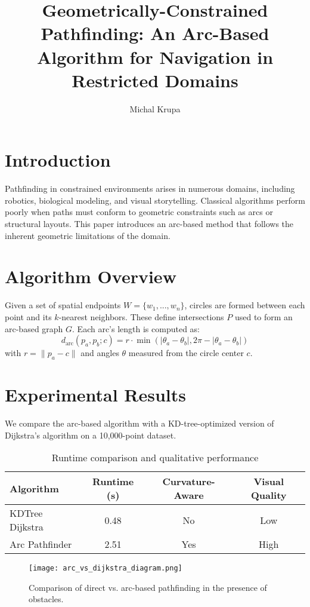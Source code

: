 \documentclass[sigconf]{acmart}
\title{Geometrically-Constrained Pathfinding: An Arc-Based Algorithm for Navigation in Restricted Domains}
\author{Michal Krupa}
\affiliation{%
  \institution{Independent Researcher}
  \country{USA}
}
\begin{document}
\maketitle

\section{Introduction}
Pathfinding in constrained environments arises in numerous domains, including robotics, biological modeling, and visual storytelling. Classical algorithms perform poorly when paths must conform to geometric constraints such as arcs or structural layouts. This paper introduces an arc-based method that follows the inherent geometric limitations of the domain.

\section{Algorithm Overview}
Given a set of spatial endpoints $W = \{w_1, ..., w_n\}$, circles are formed between each point and its $k$-nearest neighbors. These define intersections $P$ used to form an arc-based graph $G$. Each arc's length is computed as:
\[
d_{\text{arc}}(p_a, p_b; c) = r \cdot \min\left(|\theta_a - \theta_b|, 2\pi - |\theta_a - \theta_b|\right)
\]
with $r = \|p_a - c\|$ and angles $\theta$ measured from the circle center $c$.

\section{Experimental Results}
We compare the arc-based algorithm with a KD-tree-optimized version of Dijkstra’s algorithm on a 10,000-point dataset.

\begin{table}[h]
\caption{Runtime comparison and qualitative performance}
\begin{tabular}{lccc}
\toprule
Algorithm & Runtime (s) & Curvature-Aware & Visual Quality \\
\midrule
KDTree Dijkstra & 0.48 & No & Low \\
Arc Pathfinder & 2.51 & Yes & High \\
\bottomrule
\end{tabular}
\end{table}

\begin{figure}[h]
  \centering
  \texttt{[image: arc\_vs\_dijkstra\_diagram.png]}
  \caption{Comparison of direct vs. arc-based pathfinding in the presence of obstacles.}
  \label{fig:comparison}
\end{figure}
\end{document}
